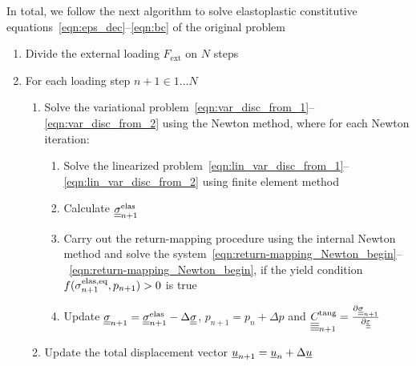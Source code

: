\documentclass[12pt]{article}
\begin{document}
In total, we follow the next algorithm to solve elastoplastic constitutive equations~\eqref{eqn:eps_dec}--\eqref{eqn:bc} of the original problem
\begin{enumerate}
    \item Divide the external loading $F_\text{ext}$ on $N$ steps 
    \item For each loading step $n+1 \in {1 \dots N}$
    \begin{enumerate}
        \item Solve the variational problem~\eqref{eqn:var_disc_from_1}--\eqref{eqn:var_disc_from_2} using the Newton method, where for each Newton iteration:
        \begin{enumerate}
            \item Solve the linearized problem~\eqref{eqn:lin_var_disc_from_1}--\eqref{eqn:lin_var_disc_from_2} using finite element method
            \item Calculate $\underline{\underline{\sigma}}_{n+1}^{\text{elas}}$ 
            \item Carry out the return-mapping procedure using the internal Newton method and solve the system~\eqref{eqn:return-mapping_Newton_begin}--~\eqref{eqn:return-mapping_Newton_begin}, if the yield condition $f(\sigma_{n+1}^\text{elas,eq}, p_{n+1}) > 0$ is true
            \item Update $\underline{\underline{\sigma}}_{n+1} = \underline{\underline{\sigma}}_{n+1}^{\text{elas}} - \Delta\underline{\underline{\sigma}}$, $p_{n+1} = p_n + \Delta p$ and $\underline{\underline{\underline{\underline{C_{}}}}}^\text{tang}_{n+1} = \frac{\partial \underline{\underline{\sigma}}_{n+1}}{\partial\underline{\underline{\varepsilon}}}$
        \end{enumerate}
        \item Update the total displacement vector $\underline{u}_{n+1} = \underline{u}_n + \Delta\underline{u}$
    \end{enumerate}
\end{enumerate}
\end{document}
